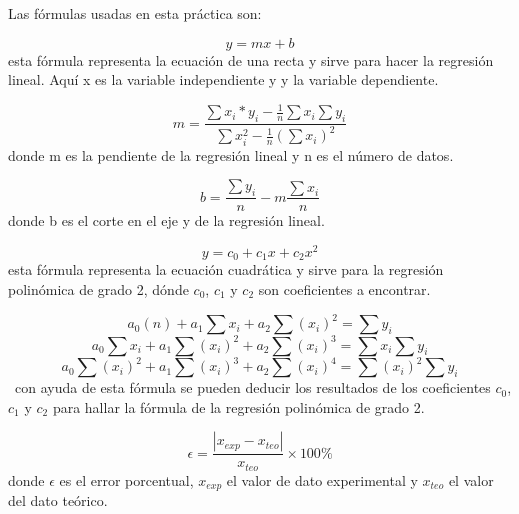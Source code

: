 \documentclass[a4paper]{article}
\begin{document}
Las fórmulas usadas en esta práctica son: 

\begin{equation}
    y=mx+b
\end{equation}
esta fórmula representa la ecuación de una recta y sirve para hacer la regresión lineal. Aquí x es la variable independiente y y la variable dependiente. 

\begin{equation}
   m=\frac{\sum x_i*y_i-\frac{1}{n}\sum x_i \sum y_i}{\sum x_i^2-\frac{1}{n}(\sum x_i)^2} 
\end{equation}
donde m es la pendiente de la regresión lineal y n es el número de datos.

\begin{equation}
    b=\frac{\sum y_i}{n}-m\frac{\sum x_i}{n}
\end{equation}
donde b es el corte en el eje y de la regresión lineal.

\begin{equation}
    y=c_0+c_1x+c_2x^2
\end{equation}
esta fórmula representa la ecuación cuadrática y sirve para la regresión polinómica de grado 2, dónde $c_0$, $c_1$ y $c_2$ son coeficientes a encontrar.

    \[a_0(n)+a_1\sum x_i+a_2\sum (x_i)^2=\sum y_i\]
    \[a_0\sum x_i+a_1\sum (x_i)^2+a_2\sum (x_i)^3=\sum x_i\sum y_i\]
    \begin{equation}
        a_0\sum (x_i)^2+a_1\sum (x_i)^3+a_2\sum (x_i)^4=\sum (x_i)^2\sum y_i
    \end{equation}\
con ayuda de esta fórmula se pueden deducir los resultados de los coeficientes $c_0$, $c_1$ y $c_2$ para hallar la fórmula de la regresión polinómica de grado 2.

\begin{equation}
    \epsilon=\frac{|x_{exp}-x_{teo}|}{x_{teo}}\times100\%
\end{equation}
  donde $\epsilon$ es el error porcentual, $x_{exp}$ el valor de dato experimental y $x_{teo}$ el valor del dato teórico.
\end{document}
